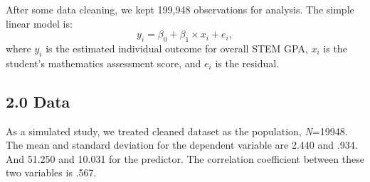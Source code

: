 \documentclass[
]{article}
\begin{document}
After some data cleaning, we kept 199,948 observations for analysis. The
simple linear model is: \[y_i = \beta_0 + \beta_1\times x_i + e_i ,\]
where \(y_i\) is the estimated individual outcome for overall STEM GPA,
\(x_i\) is the student's mathematics assessment score, and \(e_i\) is
the residual.

\hypertarget{data}{%
\subsection{2.0 Data}\label{data}}

As a simulated study, we treated cleaned dataset as the population,
\emph{N}=19948. The mean and standard deviation for the dependent
variable are 2.440 and .934. And 51.250 and 10.031 for the predictor.
The correlation coefficient between these two variables is .567.
\end{document}
